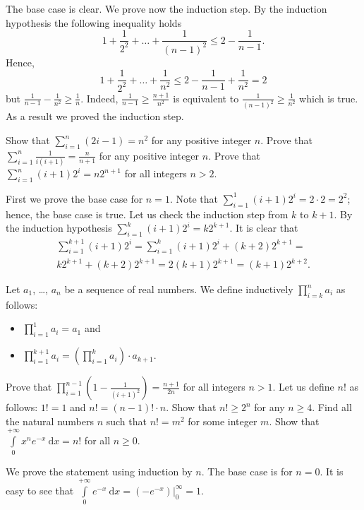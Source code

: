 \begin{chapterendexercises}
\begin{solution}
      The base case is clear. We prove now the induction step. By the induction
      hypothesis the following inequality holds
      \[
        1 + \frac{1}{2^2} + \dots + \frac{1}{(n - 1)^2} \le 2 - \frac{1}{n - 1}.
      \]
      Hence,
      \[
        1 + \frac{1}{2^2} + \dots + \frac{1}{n^2} \le 2 - \frac{1}{n - 1} + \frac{1}{n^2} = 2
      \]
      but $\frac{1}{n - 1} - \frac{1}{n^2} \ge \frac{1}{n}$. Indeed,
      $\frac{1}{n - 1} \ge \frac{n + 1}{n^2}$ is equivalent to
      $\frac{1}{(n - 1)^2} \ge \frac{1}{n^2}$ which is true. As a result we proved
      the induction step.
    \end{solution}
  \exercise Show that $\sum_{i = 1}^n (2i - 1) = n^2$ for any positive integer $n$.
  \exercise Prove that $\sum_{i = 1}^n \frac{1}{i (i + 1)} = \frac{n}{n + 1}$
    for any positive integer $n$.
  \exercise Prove that $\sum_{i = 1}^n (i + 1) 2^i = n 2^{n + 1}$ for all
    integers $n > 2$.
    \begin{solution}
      First we prove the base case for $n = 1$. Note that 
      $\sum\limits_{i = 1}^1 (i + 1) 2^i = 2 \cdot 2 = 2^2$; hence, the base
      case is true. Let us check the induction step from $k$ to $k + 1$. By
      the induction hypothesis 
      $\sum\limits_{i = 1}^k (i + 1) 2^i = k 2^{k + 1}$.
      It is clear that
      \begin{multline*}
        \sum_{i = 1}^{k + 1} (i + 1) 2^i =
        \sum_{i = 1}^k (i + 1) 2^i + (k + 2) 2^{k + 1} = \\
          k 2^{k + 1} + (k + 2) 2^{k + 1} =
          2 (k + 1) 2^{k + 1} = (k + 1) 2^{k + 2}.
        \end{multline*}
      \end{solution}
  \exercise Let $a_1$, \dots, $a_n$ be a sequence of real numbers. We define
    inductively
    $\prod_{i = k}^n a_i$ as follows:
    \begin{itemize}
      \item $\prod_{i = 1}^1 a_i = a_1$ and
      \item $\prod_{i = 1}^{k + 1} a_i =
        \left( \prod_{i = 1}^k a_i \right) \cdot a_{k + 1}$.
    \end{itemize}

    Prove that
    $\prod_{i = 1}^{n - 1} \left(1 - \frac{1}{(i + 1)^2} \right) =
      \frac{n + 1}{2n}$ for all integers $n > 1$.
  \exercise Let us define $n!$ as follows: $1! = 1$ and
    $n! = (n - 1)! \cdot n$. Show that $n! \ge 2^n$ for any $n \ge 4$.
  \exercise[open] Find all the natural numbers $n$ such that $n! = m^2$ for some
    integer $m$.
  \exercise Show that $\int\limits_0^{+\infty} x^n e^{- x} ~ \mathrm{d}x = n!$
    for all $n \ge 0$.
    \begin{solution}
      We prove the statement using induction by $n$. The base case is for $n =
      0$. It is easy to see that $\int\limits_0^{+\infty} e^{-x} ~ \mathrm{d}x
      = (-e^{-x})\big\rvert_0^\infty = 1$.
 

\end{solution}
\end{chapterendexercises}
